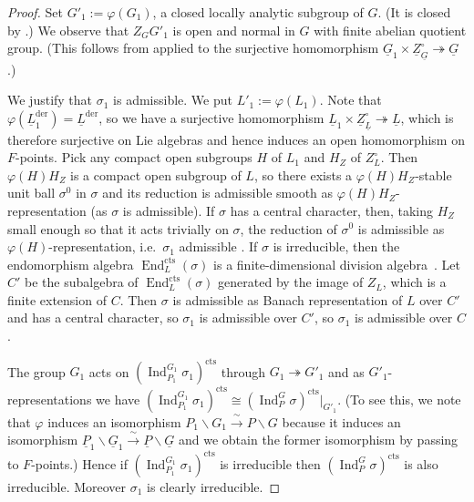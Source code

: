 \documentclass[a4paper]{amsart}
\numberwithin{equation}{section}
\theoremstyle{remark}
\theoremstyle{definition}
\DeclareMathOperator{\Ind}{Ind}
\DeclareMathOperator{\End}{End}
\newcommand{\alggrp}[1]{\underline{#1}}
\newcommand{\der}{\mathrm{der}}
\newcommand{\cts}{\mathrm{cts}}
\newcommand{\congto}{\xrightarrow{\,\sim\,}}
\newcommand{\onto}{\twoheadrightarrow}
\renewcommand{\simeq}{\cong}
\begin{document}
\begin{proof}
Set $G'_{1} := \varphi(G_{1})$, a closed locally analytic subgroup of $G$.
(It is closed by \cite[3.19 Proposition]{MR316587}.)
We observe that $Z_{G}G'_{1}$ is open and normal in $G$ with finite abelian quotient group.
(This follows from \cite[3.20 Corollary]{MR316587} applied to the surjective homomorphism $\alggrp{G}_1 \times \alggrp{Z}_{\alggrp{G}}^\circ \onto \alggrp{G}$.)


We justify that $\sigma_1$ is admissible.
We put $L'_{1} := \varphi(L_{1})$.
Note that $\varphi(\alggrp{L}_{1}^{\der}) = \alggrp{L}^{\der}$, so we have a surjective homomorphism $\alggrp{L}_{1} \times \alggrp Z_{\alggrp L}^\circ \onto \alggrp L$, which is therefore surjective on Lie algebras and hence induces an open homomorphism on $F$-points.
Pick any compact open subgroups $H$ of $L_1$ and $H_Z$ of $Z_L^\circ$.
Then $\varphi(H)H_Z$ is a compact open subgroup of $L$, so there exists a $\varphi(H)H_Z$-stable unit ball $\sigma^0$ in $\sigma$ and its reduction is admissible smooth as $\varphi(H)H_Z$-representation (as $\sigma$ is admissible).
If $\sigma$ has a central character, then, taking $H_Z$ small enough so that it acts trivially on $\sigma$, the reduction of $\sigma^0$ is admissible as $\varphi(H)$-representation, i.e.\ $\sigma_1$ admissible \cite[Proposition 6.5.7]{locallyanalytic-memoir}.
If $\sigma$ is irreducible, then the endomorphism algebra $\End_{L}^{\cts}(\sigma)$ is a finite-dimensional division algebra~\cite{MR3053464}.
Let $C'$ be the subalgebra of $\End_{L}^{\cts}(\sigma)$ generated by the image of $Z_{L}$, which is a finite extension of $C$.
Then $\sigma$ is admissible as Banach representation of $L$ over $C'$ and has a central character, so $\sigma_1$ is admissible over $C'$, so $\sigma_1$ is admissible over $C$.

The group $G_1$ acts on $(\Ind_{P_{1}}^{G_{1}}\sigma_{1})^{\cts}$ through $G_{1}\onto G'_{1}$ and as $G'_{1}$-representations we have $(\Ind_{P_{1}}^{G_{1}}\sigma_{1})^{\cts}\simeq (\Ind_{P}^{G}\sigma)^{\cts}|_{G'_{1}}$.
(To see this, we note that $\varphi$ induces an isomorphism $P_1\backslash G_1 \congto P\backslash G$ because it induces an isomorphism $\alggrp P_1\backslash \alggrp G_1 \congto \alggrp P\backslash \alggrp G$ and we obtain the former isomorphism by passing to $F$-points.)
Hence if $(\Ind_{P_{1}}^{G_{1}}\sigma_{1})^{\cts}$ is irreducible then $(\Ind_{P}^{G}\sigma)^{\cts}$ is also irreducible.
Moreover $\sigma_1$ is clearly irreducible.


\end{proof}
\end{document}

